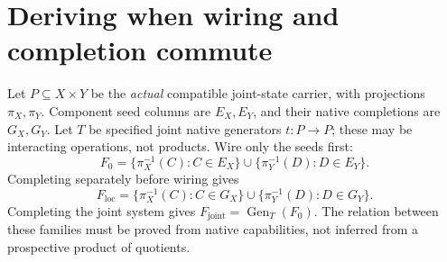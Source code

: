 \documentclass[11pt]{article}
\theoremstyle{remark}\newtheorem{remark}[theorem]{Remark}
\newcommand{\Gen}{\operatorname{Gen}}
\begin{document}
\section{Deriving when wiring and completion commute}
Let $P\subseteq X\times Y$ be the \emph{actual} compatible joint-state
carrier, with projections $\pi_X,\pi_Y$. Component seed columns are
$E_X,E_Y$, and their native completions are $G_X,G_Y$.
Let $T$ be specified joint native generators $t:P\to P$; these may
be interacting operations, not products. Wire only the seeds first:
\[
 F_0=\{\pi_X^{-1}(C):C\in E_X\}
       \cup\{\pi_Y^{-1}(D):D\in E_Y\}.
\]
Completing separately before wiring gives
\[
 F_{\mathrm{loc}}=\{\pi_X^{-1}(C):C\in G_X\}
       \cup\{\pi_Y^{-1}(D):D\in G_Y\}.
\]
Completing the joint system gives $F_{\mathrm{joint}}=\Gen_T(F_0)$.
The relation between these families must be proved from native
capabilities, not inferred from a prospective product of quotients.
\end{document}

